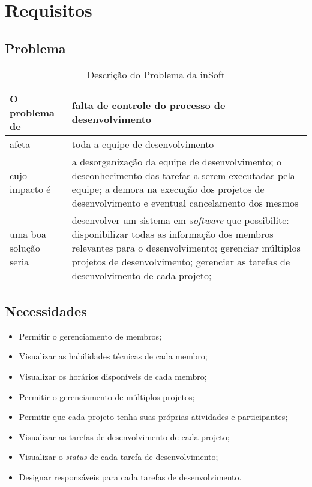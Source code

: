 \chapter{Requisitos}
\label{sec:requisitos}

\section{Problema}
    \begin{table}[H]
        \centering
        \begin{tabular}{|>{\columncolor[HTML]{C0C0C0}}p{}|p{}|}
          \hline
          O problema de         &   falta de controle do processo de desenvolvimento \\ \hline
          afeta                 &   toda a equipe de desenvolvimento                 \\ \hline
          cujo impacto é        &   a desorganização da equipe de desenvolvimento;
                                    o desconhecimento das tarefas a serem executadas pela equipe;
                                    a demora na execução dos projetos de desenvolvimento e eventual cancelamento dos mesmos                                         \\ \hline
          uma boa solução seria &   desenvolver um sistema em \emph{software} que possibilite:
                                    disponibilizar todas as informação dos membros relevantes para o desenvolvimento;
                                    gerenciar múltiplos projetos de desenvolvimento;
                                    gerenciar as tarefas de desenvolvimento de cada projeto;
                                    \\ \hline
        \end{tabular}
        \caption{Descrição do Problema da inSoft}
      \end{table}

\section{Necessidades}
    \begin{itemize}
      \item Permitir o gerenciamento de membros;
      \item Visualizar as habilidades técnicas de cada membro;
      \item Visualizar os horários disponíveis de cada membro;
      \item Permitir o gerenciamento de múltiplos projetos;
      \item Permitir que cada projeto tenha suas próprias atividades e participantes;
      \item Visualizar as tarefas de desenvolvimento de cada projeto;
      \item Visualizar o \emph{status} de cada tarefa de desenvolvimento;
      \item Designar responsáveis para cada tarefas de desenvolvimento.
    \end{itemize}
    
